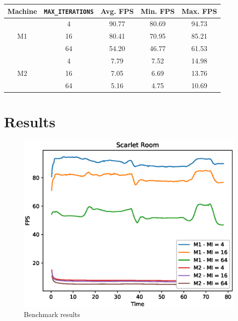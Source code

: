 \documentclass[11pt,a4paper]{report}
\begin{document}
\begin{center}
	\begin{tabular}{|c|c|c|c|c|}
		\hline
		\textbf{Machine}    & \textbf{\texttt{MAX\_ITERATIONS}} & \textbf{Avg. FPS} & \textbf{Min. FPS} & \textbf{Max. FPS} \\ \hline
		\multirow{3}{*}{M1} & 4                                 & 90.77             & 80.69             & 94.73             \\
		& 16                                & 80.41             & 70.95             & 85.21             \\
		& 64                                & 54.20             & 46.77             & 61.53             \\ \hline
		\multirow{3}{*}{M2} & 4                                 & \phantom{0}7.79   & \phantom{0}7.52   & 14.98             \\
		& 16                                & \phantom{0}7.05   & \phantom{0}6.69   & 13.76             \\
		& 64                                & \phantom{0}5.16   & \phantom{0}4.75   & 10.69             \\ \hline
	\end{tabular}
\end{center}

\section{Results}

\begin{figure}[htp]
	\centering
	\includegraphics[width=\textwidth]{benchmark/benchmark.eps}
	\caption{Benchmark results}
	\label{eval:graph}
\end{figure}
\end{document}
